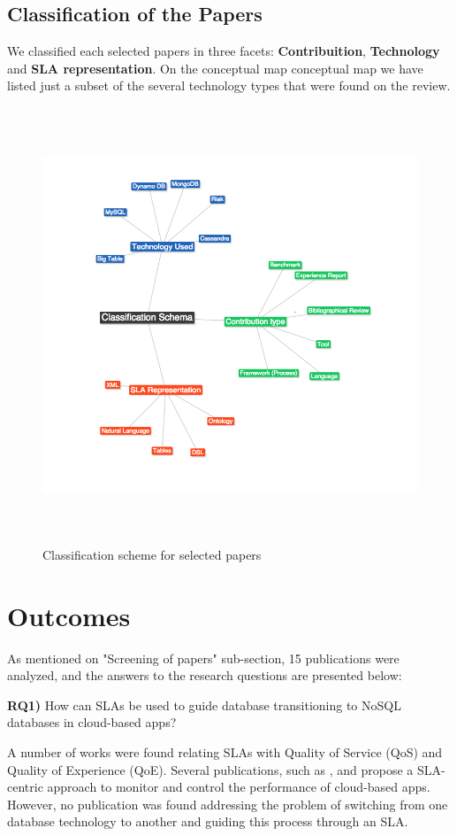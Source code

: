 \documentclass{article}
\begin{document}
\newpage
\subsection{Classification of the Papers}

We classified each selected papers in three facets: \textbf{Contribuition}, \textbf{Technology} and \textbf{SLA representation}. On the conceptual map conceptual map we have listed just a subset of the several technology types that were found on the review.

\begin{figure}[!h]
\centering
\includegraphics[height=130mm]{pic2.png}
\caption{Classification scheme for selected papers \label{overflow}}
\end{figure}

\newpage
\section{Outcomes}

As mentioned on "Screening of papers" sub-section, 15 publications were analyzed, and the answers to the research questions are presented below:

\textbf{RQ1)} How can SLAs be used to guide database transitioning to NoSQL databases in cloud-based apps? 

A number of works were found relating SLAs with Quality of Service (QoS) and Quality of Experience (QoE). Several publications, such as \cite{Xiong:2012:DMR:2213598.2213614}, \cite{Konstantinou:2012:TEN:2213836.2213943} and \cite{Klems:2012:RQM:2477172.2477488} propose a SLA-centric approach to monitor and control the performance of cloud-based apps. However, no publication was found addressing the problem of switching from one database technology to another and guiding this process through an SLA. 
\end{document}
